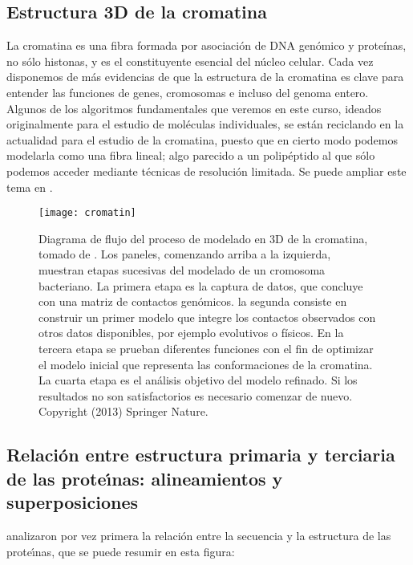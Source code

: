 \subsection{Estructura 3D de la cromatina}

La cromatina es una fibra formada por asociaci\'{o}n de DNA gen\'{o}mico y prote\'{i}nas, no s\'{o}lo histonas, y es el constituyente
esencial del n\'{u}cleo celular. Cada vez disponemos de m\'{a}s evidencias de que la estructura de la cromatina es clave para entender 
las funciones de genes, cromosomas e incluso del genoma entero. Algunos de los algoritmos fundamentales que veremos en este curso,
ideados originalmente para el estudio de mol\'{e}culas individuales,
se est\'{a}n reciclando en la actualidad para el estudio de la cromatina, puesto que en cierto modo podemos
modelarla como una fibra lineal; algo parecido a un polip\'{e}ptido al que s\'{o}lo podemos acceder mediante t\'{e}cnicas 
de resoluci\'{o}n limitada. Se puede ampliar este tema en \citet{bau_davide_2014_1066356}.

\begin{figure}
\begin{center} 
\texttt{[image: cromatin]}
\caption%
{
Diagrama de flujo del proceso de modelado en 3D de la cromatina, tomado de \citep{Dekker2013}. 
Los paneles, comenzando arriba a la izquierda, muestran etapas sucesivas del modelado de un cromosoma bacteriano.
La primera etapa es la captura de datos, que concluye con una matriz de contactos gen\'{o}micos.
la segunda consiste en construir un primer modelo que integre los contactos observados con otros datos disponibles,
por ejemplo evolutivos o f\'{i}sicos. En la tercera etapa se prueban diferentes funciones con el fin de optimizar
el modelo inicial que representa las conformaciones de la cromatina. 
La cuarta etapa es el an\'{a}lisis objetivo del modelo refinado. 
Si los resultados no son satisfactorios es necesario comenzar de nuevo.
Copyright (2013) Springer Nature. 
}
\label{fig:cromatin}
\end{center}
\end{figure}


\subsection{Relaci\'{o}n entre estructura primaria y terciaria de las prote\'\i{}nas: alineamientos y superposiciones} \label{3dcons}

\cite{Chothia1986} analizaron por vez primera la relaci\'{o}n entre la secuencia y la estructura de las prote\'\i{}nas, 
que se puede resumir en esta figura:

